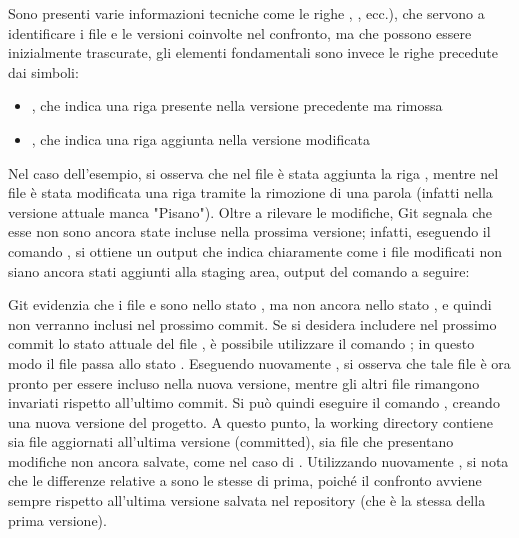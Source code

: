 Sono presenti varie informazioni tecniche come le righe , , ecc.), che servono a identificare i file e le versioni coinvolte nel confronto, ma che possono essere inizialmente trascurate, gli elementi fondamentali sono invece le righe precedute dai simboli:
\begin{itemize}
	\item \tc{-}, che indica una riga presente nella versione precedente ma rimossa
	\item \tc{+}, che indica una riga aggiunta nella versione modificata
\end{itemize}
Nel caso dell'esempio, si osserva che nel file  è stata aggiunta la riga , mentre nel file  è stata modificata una riga tramite la rimozione di una parola (infatti nella versione attuale manca "Pisano"). Oltre a rilevare le modifiche, Git segnala che esse non sono ancora state incluse nella prossima versione; infatti, eseguendo il comando , si ottiene un output che indica chiaramente come i file modificati non siano ancora stati aggiunti alla staging area, output del comando a seguire:
Git evidenzia che i file  e  sono nello stato , ma non ancora nello stato , e quindi non verranno inclusi nel prossimo commit.
Se si desidera includere nel prossimo commit lo stato attuale del file , è possibile utilizzare il comando ; in questo modo il file passa allo stato . 
Eseguendo nuovamente , si osserva che tale file è ora pronto per essere incluso nella nuova versione, mentre gli altri file rimangono invariati rispetto all'ultimo commit. Si può quindi eseguire il comando , creando una nuova versione del progetto.
A questo punto, la working directory contiene sia file aggiornati all'ultima versione (committed), sia file che presentano modifiche non ancora salvate, come nel caso di . Utilizzando nuovamente , si nota che le differenze relative a  sono le stesse di prima, poiché il confronto avviene sempre rispetto all'ultima versione salvata nel repository (che è la stessa della prima versione). 
